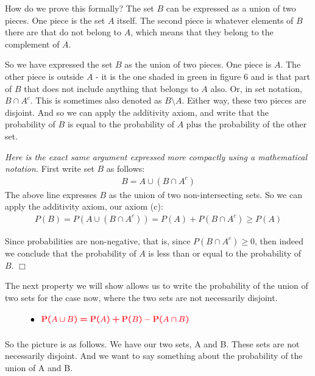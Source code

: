 \documentclass{tufte-handout}
\begin{document}
How do we prove this formally? The set $B$ can be expressed as a union of two pieces. One piece is the
set $A$ itself. The second piece is whatever elements of $B$ there are that do not belong to $A$, which means that
they belong to the complement of $A$.

So we have expressed the set $B$ as the union of two pieces. One piece is $A$. The other piece is
outside $A$ - it is the one shaded in green in figure 6 and is that part of $B$ that does not include anything that belongs to $A$ also. Or, in set notation, $B \cap A^c$. This is sometimes also denoted as $B \setminus A$. Either way, these two pieces are disjoint. And so we can apply the additivity axiom, and write that the
probability of $B$ is equal to the probability of $A$ plus the probability of the other set.

\vspace{0.2cm}
\textit{Here is the exact same argument expressed more compactly using a mathematical notation.} First write set $B$ as follows: 
\begin{align*}
B = A \cup (B \cap A^c)
\end{align*}
The above line expresses $B$ as the union of two non-intersecting sets. So we can apply the additivity axiom, our axiom (c):
\begin{align*}
P(B )= P(A \cup (B \cap A^c)) = P(A) + P(B \cap A^c) \geq P(A)
\end{align*}

Since probabilities are non-negative, that is, since $P(B \cap A^c) \geq 0$, then indeed  we conclude that the probability of $A$ is less than or equal to the probability of $B.$ $\Box$


 The next property we will show allows us to write the probability of the union of two
sets for the case now, where the two sets are not necessarily disjoint. 

\begin{figure}
  \includegraphics[width=7cm]{Conseq2}
\end{figure}

So the picture is as follows. We
have our two sets, A and B. These sets are not necessarily disjoint. And we want to say something
about the probability of the union of A and B.
\end{document}
